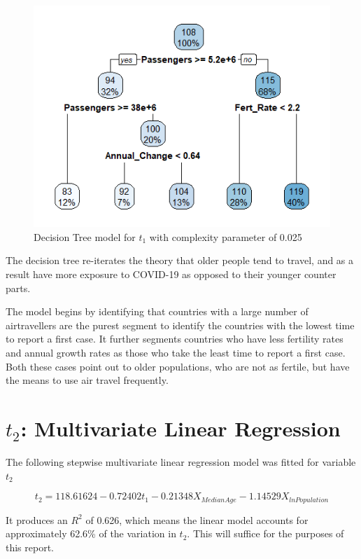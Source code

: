 \documentclass[]{report}
\begin{document}
\begin{figure}[htb]
	\centering
	\caption{Decision Tree model for $t_1$ with complexity parameter of 0.025 }
	\includegraphics{tree.png}
\end{figure}


The decision tree re-iterates the theory that older people tend to travel, and as a result have more exposure to COVID-19 as opposed to their younger counter parts. 

The model begins by identifying that countries with a large number of airtravellers are the purest segment to identify the countries with the lowest time to report a first case. It further segments countries who have less fertility rates and annual growth rates as those who take the least time to report a first case. Both these cases point out to older populations, who are not as fertile, but have the means to use air travel frequently.

\newpage

\section{$t_2$: Multivariate Linear Regression}

The following stepwise multivariate linear regression model was fitted for variable $t_2$

$$t_2 = 118.61624 -0.72402 t_1 - 0.21348 X_{Median Age} -1.14529 X_{lnPopulation}$$

It produces an $R^2$ of 0.626, which means the linear model accounts for approximately 62.6\% of the variation in $t_2$. This will suffice for the purposes of this report.
\end{document}
